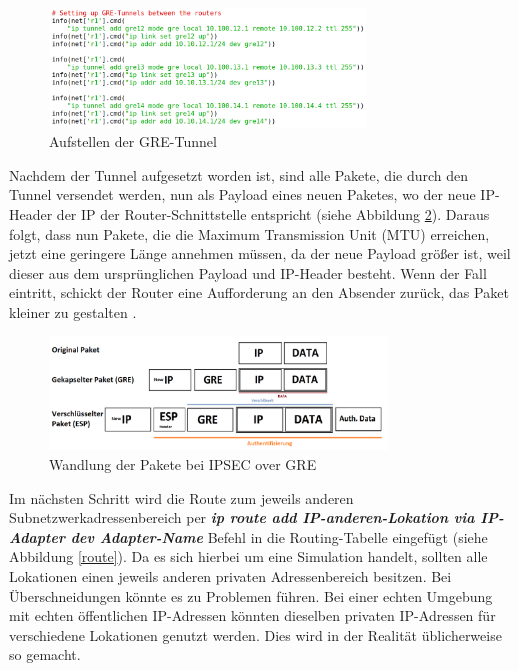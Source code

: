 \documentclass[fontsize=12pt,paper=a4,open=any,parskip=half,
  twoside=false,toc=listof,toc=bibliography,fleqn,leqno,
  captions=nooneline,captions=tableabove,british]{scrbook}
\begin{document}
\begin{figure}[H]
 \centering
 \includegraphics[width=0.75\textwidth]{Bilder/gre}
 \captionsetup{justification=centering,margin=2cm}
 \caption{Aufstellen der GRE-Tunnel}
 \label{gre}
\end{figure}

Nachdem der Tunnel aufgesetzt worden ist, sind alle Pakete, die durch den Tunnel versendet werden, nun als Payload eines neuen Paketes, wo der neue IP-Header der IP der Router-Schnittstelle entspricht \cite{newpayload} (siehe Abbildung \ref{ipsecgre}). Daraus folgt, dass nun Pakete, die die Maximum Transmission Unit (MTU) erreichen, jetzt eine geringere Länge annehmen müssen, da der neue Payload größer ist, weil dieser aus dem ursprünglichen Payload und IP-Header besteht. Wenn der Fall eintritt, schickt der Router eine Aufforderung an den Absender zurück, das Paket kleiner zu gestalten \cite{MTU}.

\begin{figure}[H]
	\centering
	\includegraphics[width=0.8\textwidth]{Bilder/ipsecgre}
	\captionsetup{justification=centering,margin=2cm}
	\caption{Wandlung der Pakete bei IPSEC over GRE}
	\label{ipsecgre}
\end{figure}

Im nächsten Schritt wird die Route zum jeweils anderen Subnetzwerkadressenbereich per \textit{\textbf{ip route add IP-anderen-Lokation via IP-Adapter dev Adapter-Name}} Befehl in die Routing-Tabelle eingefügt \cite{addroute} (siehe Abbildung \ref{route}). Da es sich hierbei um eine Simulation handelt, sollten alle Lokationen einen jeweils anderen privaten Adressenbereich besitzen. Bei Überschneidungen könnte es zu Problemen führen. Bei einer echten Umgebung mit echten öffentlichen IP-Adressen könnten dieselben privaten IP-Adressen für verschiedene Lokationen genutzt werden. Dies wird in der Realität üblicherweise so gemacht.
\end{document}
